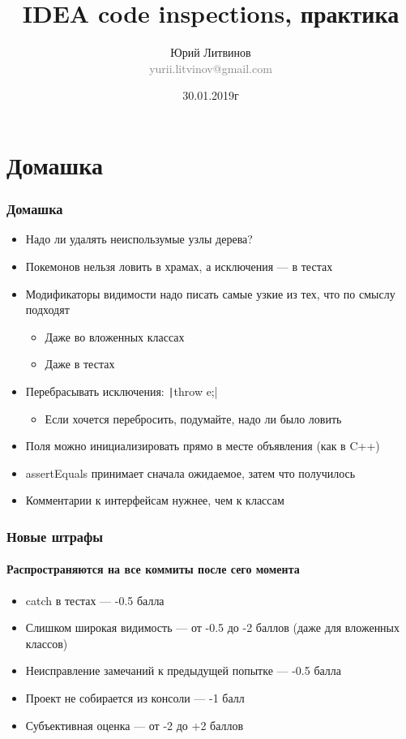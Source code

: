 \documentclass[xetex,mathserif,serif]{beamer}
\title{IDEA code inspections, практика}
\author[Юрий Литвинов]{Юрий Литвинов\\\small{\textcolor{gray}{yurii.litvinov@gmail.com}}}
\date{30.01.2019г}
\begin{document}
	\frame{\titlepage}

	\section{Домашка}

	\begin{frame}
		\frametitle{Домашка}
		\begin{itemize}
			\item Надо ли удалять неиспользумые узлы дерева?
			\item Покемонов нельзя ловить в храмах, а исключения --- в тестах
			\item Модификаторы видимости надо писать самые узкие из тех, что по смыслу подходят
			\begin{itemize}
				\item Даже во вложенных классах
				\item Даже в тестах
			\end{itemize} 
			\item Перебрасывать исключения: \texttt|throw e;|
			\begin{itemize}
				\item Если хочется перебросить, подумайте, надо ли было ловить
			\end{itemize}
			\item Поля можно инициализировать прямо в месте объявления (как в C++)
			\item assertEquals принимает сначала ожидаемое, затем что получилось
			\item Комментарии к интерфейсам нужнее, чем к классам
		\end{itemize}
	\end{frame}

	\begin{frame}
		\frametitle{Новые штрафы}
		\framesubtitle{Распространяются на все коммиты после сего момента}
		\begin{itemize}
			\item catch в тестах --- -0.5 балла
			\item Слишком широкая видимость --- от -0.5 до -2 баллов (даже для вложенных классов)
			\item Неисправление замечаний к предыдущей попытке --- -0.5 балла
			\item Проект не собирается из консоли --- -1 балл
			\item Субъективная оценка --- от -2 до +2 баллов
		\end{itemize}
	\end{frame}
\end{document}
